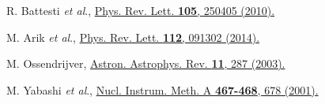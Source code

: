 \documentclass[10pt,a4paper]{article}%
\begin{document}
\begin{thebibliography}{999}
R. Battesti {\it et al}.,
\href{https://doi.org/10.1103/PhysRevLett.105.250405}
{Phys. Rev. Lett. {\bf 105}, 250405 (2010).}

M. Arik {\it et al}.,
\href{https://doi.org/10.1103/PhysRevLett.112.091302}
{Phys. Rev. Lett. {\bf 112}, 091302 (2014).}

M. Ossendrijver,
\href{https://doi.org/10.1007/s00159-003-0019-3}
{Astron. Astrophys. Rev. {\bf 11}, 287 (2003).}

M. Yabashi {\it et al}.,
\href{https://doi.org/10.1016/S0168-9002(01)00444-2}
{Nucl. Instrum. Meth. A {\bf 467-468}, 678 (2001).}

\end{thebibliography}
\end{document}
